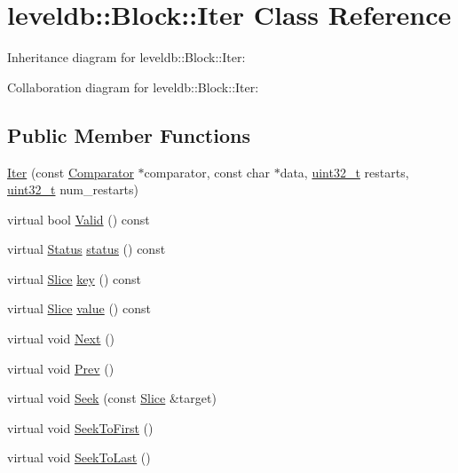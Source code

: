 \hypertarget{classleveldb_1_1_block_1_1_iter}{}\section{leveldb\+:\+:Block\+:\+:Iter Class Reference}
\label{classleveldb_1_1_block_1_1_iter}


Inheritance diagram for leveldb\+:\+:Block\+:\+:Iter\+:


Collaboration diagram for leveldb\+:\+:Block\+:\+:Iter\+:
\subsection*{Public Member Functions}
\begin{DoxyCompactItemize}
\item 
\hyperlink{classleveldb_1_1_block_1_1_iter_a31b124ec1fc5750b31b182dc44282588}{Iter} (const \hyperlink{structleveldb_1_1_comparator}{Comparator} $\ast$comparator, const char $\ast$data, \hyperlink{stdint_8h_a435d1572bf3f880d55459d9805097f62}{uint32\+\_\+t} restarts, \hyperlink{stdint_8h_a435d1572bf3f880d55459d9805097f62}{uint32\+\_\+t} num\+\_\+restarts)
\item 
virtual bool \hyperlink{classleveldb_1_1_block_1_1_iter_ac4be155bfc93e1d2b90cfd670f22c1ba}{Valid} () const 
\item 
virtual \hyperlink{classleveldb_1_1_status}{Status} \hyperlink{classleveldb_1_1_block_1_1_iter_a39f400b72dc79931145600a702b71c61}{status} () const 
\item 
virtual \hyperlink{classleveldb_1_1_slice}{Slice} \hyperlink{classleveldb_1_1_block_1_1_iter_a1378d5e1fb17638427fd0a0f7fc7a010}{key} () const 
\item 
virtual \hyperlink{classleveldb_1_1_slice}{Slice} \hyperlink{classleveldb_1_1_block_1_1_iter_afb28e69efec54ca9306fc504e139bf3f}{value} () const 
\item 
virtual void \hyperlink{classleveldb_1_1_block_1_1_iter_a27dacbefa903333a5ad003ccd3e424b6}{Next} ()
\item 
virtual void \hyperlink{classleveldb_1_1_block_1_1_iter_a096747ff77d5090579fe4cd4e464a3c9}{Prev} ()
\item 
virtual void \hyperlink{classleveldb_1_1_block_1_1_iter_a3dcefc0609937b33c046ac7fafb52ad7}{Seek} (const \hyperlink{classleveldb_1_1_slice}{Slice} \&target)
\item 
virtual void \hyperlink{classleveldb_1_1_block_1_1_iter_aecc19bb6d8a219e7fb8e695fb5b57bd3}{Seek\+To\+First} ()
\item 
virtual void \hyperlink{classleveldb_1_1_block_1_1_iter_a3007d98d17a03138c629fc2b2eb56204}{Seek\+To\+Last} ()
\end{DoxyCompactItemize}
